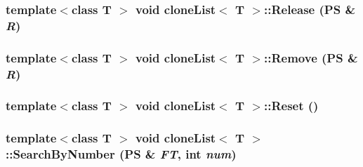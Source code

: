 \label{classclone_list_a5c93719d6da05ac5249e8535c5c644d8}
\hypertarget{classclone_list_a9dd071686629c50a473d691f2de1e0a2}{
\subsubsection[{Release}]{\setlength{\rightskip}{0pt plus 5cm}template$<$class T $>$ void {\bf cloneList}$<$ T $>$::Release ({\bf PS} \& {\em R})}}
\label{classclone_list_a9dd071686629c50a473d691f2de1e0a2}
\hypertarget{classclone_list_adbe44f675a57126b264432f5eda3f5fb}{
\subsubsection[{Remove}]{\setlength{\rightskip}{0pt plus 5cm}template$<$class T $>$ void {\bf cloneList}$<$ T $>$::Remove ({\bf PS} \& {\em R})}}
\label{classclone_list_adbe44f675a57126b264432f5eda3f5fb}
\hypertarget{classclone_list_a7f47b063b2357a0b391da5ecc9745524}{
\subsubsection[{Reset}]{\setlength{\rightskip}{0pt plus 5cm}template$<$class T $>$ void {\bf cloneList}$<$ T $>$::Reset ()}}
\label{classclone_list_a7f47b063b2357a0b391da5ecc9745524}
\hypertarget{classclone_list_a0f871eb3e2f58a5c391fea0559e3e9fb}{
\subsubsection[{SearchByNumber}]{\setlength{\rightskip}{0pt plus 5cm}template$<$class T $>$ void {\bf cloneList}$<$ T $>$::SearchByNumber ({\bf PS} \& {\em FT}, \/  int {\em num})}}
\label{classclone_list_a0f871eb3e2f58a5c391fea0559e3e9fb}


